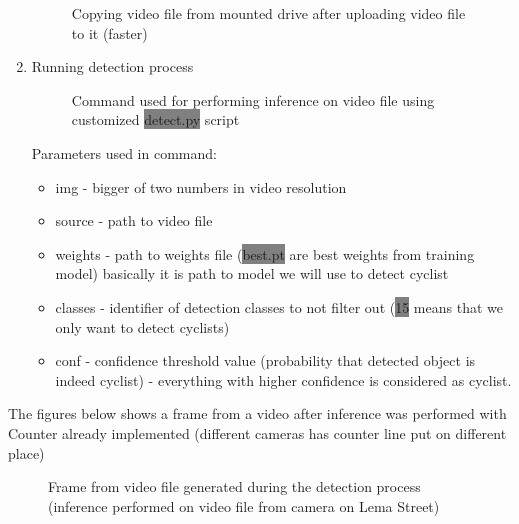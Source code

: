 \begin{enumerate}
\begin{figure} [h]
        \caption{Copying video file from mounted drive after uploading video file to it (faster)}
        \label{fig:inference3}
    \end{figure}
    \item Running detection process
    \newline \begin{figure} [h]
        \centering
        \caption{Command used for performing inference on video file using customized \colorbox{Gray}{detect.py} script}
        \label{fig:inference4}
    \end{figure}
    \newline Parameters used in command:
    \begin{itemize}
        \item img - bigger of two numbers in video resolution
        \item source - path to video file
        \item weights - path to weights file (\colorbox{Gray}{best.pt} are best weights from training model) basically it is path to model we will use to detect cyclist
        \item classes - identifier of detection classes to not filter out (\colorbox{Gray}{15} means that we only want to detect cyclists)
        \item conf - confidence threshold value (probability that detected object is indeed cyclist) - everything with higher confidence is considered as cyclist.
    \end{itemize}
\end{enumerate}
The figures below shows a frame from a video after inference was performed with Counter already implemented (different cameras has counter line put on different place)
\begin{figure} [h]
    \centering
    \caption{Frame from video file generated during the detection process (inference performed on video file from camera on Lema Street)}
    \label{fig:inference}
\end{figure}
